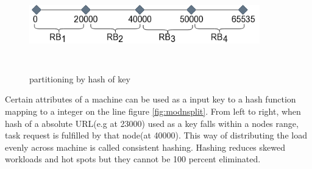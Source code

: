 \begin{figure}[h!]
  \centering
  \includegraphics[width=10cm,height=4cm,keepaspectratio]{../media/crawler/requestboundaries.png}
  \caption{partitioning by hash of key}
  \label{fig:requestboundary}
\end{figure}

\pagebreak

\noindent
Certain attributes of a machine can be used as a input key to a hash function mapping to a integer on the
line figure \ref{fig:modnsplit}. From left to right, when hash of a absolute URL(e.g at 23000) used as a
key falls within a nodes range, task request is fulfilled by that node(at 40000). This way of distributing
the load evenly across machine is called consistent hashing\cite{consisthash}. Hashing reduces skewed
workloads and hot spots but they cannot be 100 percent eliminated.

